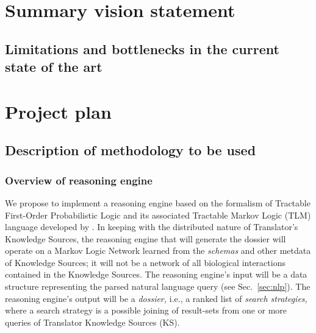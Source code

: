 \documentclass[11pt,notitlepage]{article}
\begin{document}
\section{Summary vision statement}
\subsection{Limitations and bottlenecks in the current state of the art}

\section{Project plan}
\subsection{Description of methodology to be used}
\subsubsection{Overview of reasoning engine}
We propose to implement a reasoning engine based on the formalism of Tractable
First-Order Probabilistic Logic and its associated Tractable Markov Logic (TLM)
language developed by \citet{Domingos:2012wi}. In keeping with the distributed
nature of Translator's Knowledge Sources, the reasoning engine that will
generate the dossier will operate on a Markov Logic Network learned from the
{\em schemas\/} and other metdata of Knowledge Sources; it will not be a network
of all biological interactions contained in the Knowledge Sources. The reasoning
engine's input will be a data structure representing the parsed natural language
query (see Sec.~\ref{sec:nlp}). The reasoning engine's output will be a {\em
  dossier,\/} i.e., a ranked list of {\em search strategies,\/} where a search
strategy is a possible joining of result-sets from one or more queries of
Translator Knowledge Sources (KS).
\end{document}
